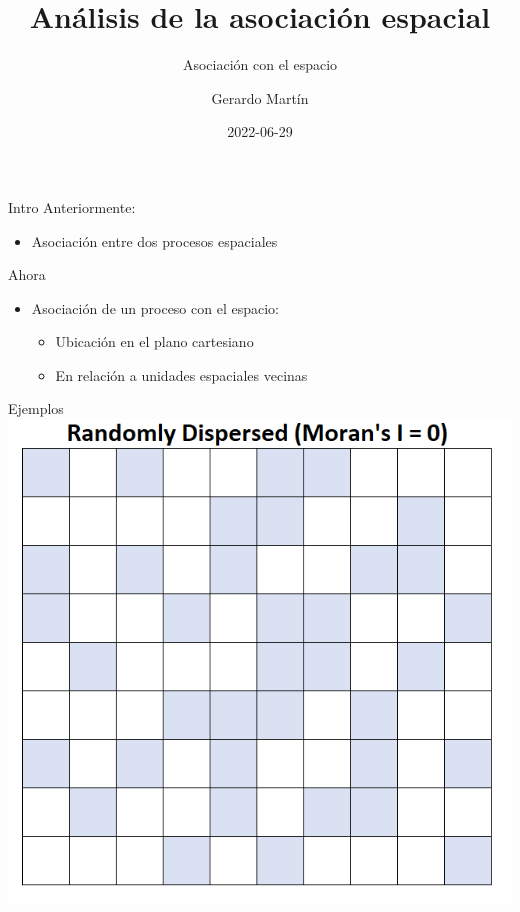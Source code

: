 \documentclass[
  11pt,
  ignorenonframetext,
]{beamer}
\title{Análisis de la asociación espacial}
\subtitle{Asociación con el espacio}
\author{Gerardo Martín}
\date{2022-06-29}
\providecommand{\tightlist}{%
  \setlength{\itemsep}{0pt}\setlength{\parskip}{0pt}}
\begin{document}
\frame{\titlepage}

\begin{frame}{Intro}
\protect\hypertarget{intro}{}
Anteriormente:

\begin{itemize}
\tightlist
\item
  Asociación entre dos procesos espaciales
\end{itemize}

Ahora

\begin{itemize}
\item
  Asociación de un proceso con el espacio:

  \begin{itemize}
  \tightlist
  \item
    Ubicación en el plano cartesiano
  \item
    En relación a unidades espaciales vecinas
  \end{itemize}
\end{itemize}
\end{frame}

\begin{frame}{Ejemplos}
\protect\hypertarget{ejemplos}{}
\includegraphics{Asociacion-imagenes/morani1.png}
\end{frame}
\end{document}
